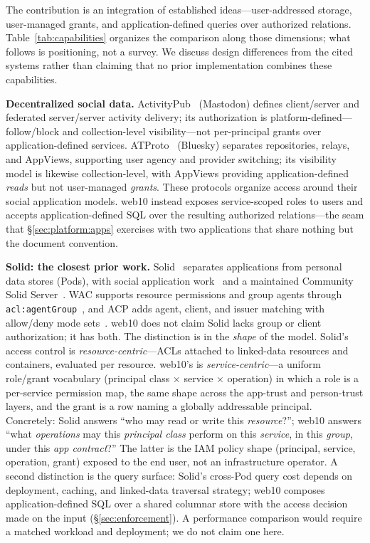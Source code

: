 \documentclass[sigconf, nonacm]{acmart}
\begin{document}
The contribution is an integration of established ideas---user-addressed
storage, user-managed grants, and application-defined queries over
authorized relations. Table~\ref{tab:capabilities} organizes the comparison
along those dimensions; what follows is positioning, not a survey. We
discuss design differences from the cited systems rather than claiming that
no prior implementation combines these capabilities.

\textbf{Decentralized social data.}
ActivityPub~\cite{activitypub2018} (Mastodon) defines client/server and
federated server/server activity delivery; its authorization is
platform-defined---follow/block and collection-level visibility---not
per-principal grants over application-defined services.
ATProto~\cite{kleppmann2024} (Bluesky) separates repositories, relays, and
AppViews, supporting user agency and provider switching; its visibility model
is likewise collection-level, with AppViews providing application-defined
\emph{reads} but not user-managed \emph{grants}. These protocols organize
access around their social application models. web10 instead exposes
service-scoped roles to users and accepts application-defined SQL over the
resulting authorized relations---the seam that \S\ref{sec:platform:apps}
exercises with two applications that share nothing but the document
convention.

\textbf{Solid: the closest prior work.}
Solid~\cite{solid2016} separates applications from personal data stores
(Pods), with social application work~\cite{solid-apps2016} and a maintained
Community Solid Server~\cite{css2024}. WAC supports resource permissions and
group agents through \texttt{acl:agentGroup}~\cite{wac2022}, and ACP adds
agent, client, and issuer matching with allow/deny mode
sets~\cite{acp2022}. web10 does not claim Solid lacks group or client
authorization; it has both. The distinction is in the \emph{shape} of the
model. Solid's access control is \emph{resource-centric}---ACLs attached to
linked-data resources and containers, evaluated per resource. web10's is
\emph{service-centric}---a uniform role/grant vocabulary
(principal class $\times$ service $\times$ operation) in which a role is a
per-service permission map, the same shape across the app-trust and
person-trust layers, and the grant is a row naming a globally addressable
principal. Concretely: Solid answers ``who may read or write this
\emph{resource}?''; web10 answers ``what \emph{operations} may this
\emph{principal class} perform on this \emph{service}, in this
\emph{group}, under this \emph{app contract}?'' The latter is the IAM policy
shape (principal, service, operation, grant) exposed to the end user, not an
infrastructure operator. A second distinction is the query surface: Solid's
cross-Pod query cost depends on deployment, caching, and linked-data
traversal strategy; web10 composes application-defined SQL over a shared
columnar store with the access decision made on the input
(\S\ref{sec:enforcement}). A performance comparison would require a matched
workload and deployment; we do not claim one here.
\end{document}
